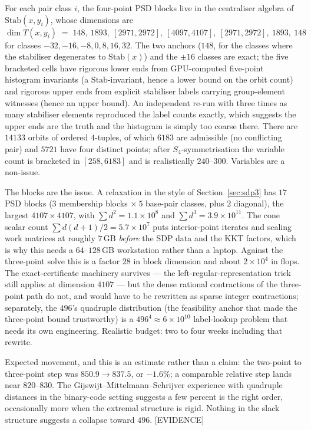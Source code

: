 \documentclass[10pt,a4paper]{article}
\newcommand{\EV}{\textsf{[EVIDENCE]}}
\begin{document}
For each pair class $i$, the four-point PSD blocks live in the centraliser algebra of
$\mathrm{Stab}(x,y_i)$, whose dimensions are
\[
  \dim T(x,y_i) \;=\; 148,\ 1893,\ [2971,2972],\ [4097,4107],\ [2971,2972],\ 1893,\ 148
\]
for classes $-32,-16,-8,0,8,16,32$. The two anchors ($148$, for the classes where the stabiliser
degenerates to $\mathrm{Stab}(x)$) and the $\pm 16$ classes are exact; the five bracketed cells have
rigorous lower ends from GPU-computed five-point histogram invariants (a $\mathrm{Stab}$-invariant,
hence a lower bound on the orbit count) and rigorous upper ends from explicit stabiliser labels
carrying group-element witnesses (hence an upper bound). An independent re-run with three times as
many stabiliser elements reproduced the label counts exactly, which suggests the upper ends are
the truth and the histogram is simply too coarse there. There are $14133$ orbits of ordered
$4$-tuples, of which $6183$ are admissible (no conflicting pair) and $5721$ have four distinct
points; after $S_4$-symmetrisation the variable count is bracketed in $[258, 6183]$ and is
realistically $240$--$300$. Variables are a non-issue.

The blocks are the issue. A relaxation in the style of Section~\ref{sec:sdp3} has $17$ PSD blocks
($3$ membership blocks $\times\ 5$ base-pair classes, plus $2$ diagonal), the largest
$4107 \times 4107$, with $\sum d^2 = 1.1 \times 10^8$ and $\sum d^3 = 3.9 \times 10^{11}$. The cone
scalar count $\sum d(d+1)/2 = 5.7 \times 10^7$ puts interior-point iterates and scaling work
matrices at roughly $7$\,GB \emph{before} the SDP data and the KKT factors, which is why this needs a
$64$--$128$\,GB workstation rather than a laptop. Against the three-point solve this is a factor
$28$ in block dimension and about $2 \times 10^4$ in flops. The exact-certificate machinery survives
--- the left-regular-representation trick still applies at dimension $4107$ --- but the dense
rational contractions of the three-point path do not, and would have to be rewritten as sparse
integer contractions; separately, the $496$'s quadruple distribution (the feasibility anchor that
made the three-point bound trustworthy) is a $496^4 \approx 6\times 10^{10}$ label-lookup problem
that needs its own engineering. Realistic budget: two to four weeks including that rewrite.

Expected movement, and this is an estimate rather than a claim: the two-point to three-point step
was $850.9 \to 837.5$, or $-1.6\%$; a comparable relative step lands near $820$--$830$. The
Gijswijt--Mittelmann--Schrijver experience with quadruple distances in the binary-code setting
suggests a few percent is the right order, occasionally more when the extremal structure is rigid.
Nothing in the slack structure suggests a collapse toward $496$. \EV{}
\end{document}
